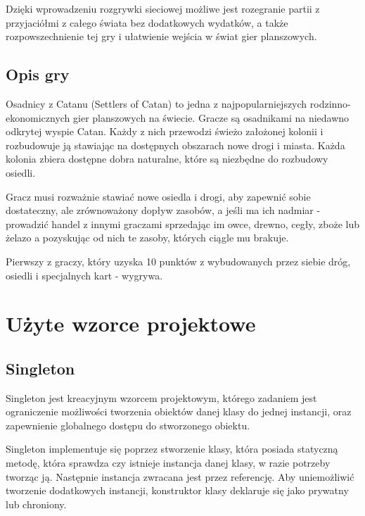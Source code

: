 \documentclass[a4paper, 11pt]{article}
\begin{document}
	Dzięki wprowadzeniu rozgrywki sieciowej możliwe jest rozegranie partii z przyjaciółmi z całego świata bez dodatkowych wydatków, a także rozpowszechnienie tej gry i ułatwienie wejścia w świat gier planszowych. 
	\subsection{Opis gry}
	\indent
	
Osadnicy z Catanu (Settlers of Catan) to jedna z najpopularniejszych rodzinno-ekonomicznych gier planszowych na świecie. 
Gracze są osadnikami na niedawno odkrytej wyspie Catan. Każdy z nich przewodzi świeżo założonej kolonii i rozbudowuje ją stawiając na dostępnych obszarach nowe drogi i miasta. Każda kolonia zbiera dostępne dobra naturalne, które są niezbędne do rozbudowy osiedli.
 
Gracz musi rozważnie stawiać nowe osiedla i drogi, aby zapewnić sobie dostateczny, ale zrównoważony dopływ zasobów, a jeśli ma ich nadmiar - prowadzić handel z innymi graczami sprzedając im owce, drewno, cegły, zboże lub żelazo a pozyskując od nich te zasoby, których ciągle mu brakuje.
 
Pierwszy z graczy, który uzyska 10 punktów z wybudowanych przez siebie dróg, osiedli i specjalnych kart - wygrywa.
	

	
	
	
	
	
	\section{Użyte wzorce projektowe}
	\subsection{Singleton}
\indent

Singleton jest kreacyjnym wzorcem projektowym, którego zadaniem jest ograniczenie możliwości tworzenia obiektów danej klasy do jednej instancji, oraz zapewnienie globalnego dostępu do stworzonego obiektu.

Singleton implementuje się poprzez stworzenie klasy, która posiada statyczną metodę, która sprawdza czy istnieje instancja danej klasy, w razie potrzeby tworząc ją. Następnie instancja zwracana jest przez referencję. Aby uniemożliwić tworzenie dodatkowych instancji, konstruktor klasy deklaruje się jako prywatny lub chroniony.
\end{document}

